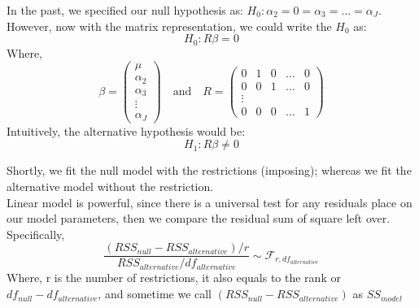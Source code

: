 \documentclass[12pt ]{article}
\begin{document}
In the past, we specified our null hypothesis as: $H_{0}: \alpha_{2} = 0 = \alpha_{3} = \ldots = \alpha_{J}$. However, now with the matrix representation, we could write the $H_{0}$ as:
\begin{equation*}
H_{0}: R\beta = 0
\end{equation*}
Where,
\begin{equation*}
    \beta = \begin{pmatrix}
    \mu \\
    \alpha_{2}\\
    \alpha_{3}\\
    \vdots\\
    \alpha_{J}
    \end{pmatrix}
    \quad\text{and}\quad
    R = \begin{pmatrix}
    0 & 1 & 0 & \dots & 0\\
    0 & 0 & 1 & \dots & 0 \\
    \vdots \\
    0 & 0 & 0 & \dots & 1
    \end{pmatrix}
\end{equation*}
Intuitively, the alternative hypothesis would be:
\begin{equation*}
H_{1}: R\beta \neq 0
\end{equation*}

Shortly, we fit the null model with the restrictions (imposing); whereas we fit the alternative model without the restriction.\\

\noindent
Linear model is powerful, since there is a universal test for any residuals place on our model parameters, then we compare the residual sum of square left over. Specifically,
\begin{equation*}
\frac{(RSS_{null} - RSS_{alternative}) / r}{RSS_{alternative} / df_{alternative}} \sim \mathcal{F}_{r, df_{alternative}}
\end{equation*}
Where, r is the number of restrictions, it also equals to the rank or $df_{null} - df_{alternative}$, and sometime we call $(RSS_{null} - RSS_{alternative})$ as $SS_{model}$\\
\end{document}
